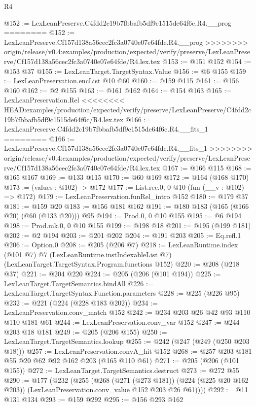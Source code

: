 \begin{lexlean}{R4}
\begin{coremodule}
{{{{{{{{@152 := LexLeanPreserve.C4fdd2c19b7fbbafb5df9c1515de64f6c.R4.__prog
========
@152 := LexLeanPreserve.Cf157d138a56cec2fc3a0740e07e64fde.R4.__prog
>>>>>>>> origin/release/v0.4:examples/production/expected/verify/preserve/LexLeanPreserve/Cf157d138a56cec2fc3a0740e07e64fde/R4.lex.tex
@153 := @151 @152
@154 := @153 @37
@155 := LexLeanTarget.TargetSyntax.Value
@156 := @6 @155
@159 := LexLeanPreservation.encList @10 @60
@160 := @159 @115
@161 := @156 @160
@162 := @2 @155
@163 := @161 @162
@164 := @154 @163
@165 := LexLeanPreservation.Rel
<<<<<<<< HEAD:examples/production/expected/verify/preserve/LexLeanPreserve/C4fdd2c19b7fbbafb5df9c1515de64f6c/R4.lex.tex
@166 := LexLeanPreserve.C4fdd2c19b7fbbafb5df9c1515de64f6c.R4.__fits_1
========
@166 := LexLeanPreserve.Cf157d138a56cec2fc3a0740e07e64fde.R4.__fits_1
>>>>>>>> origin/release/v0.4:examples/production/expected/verify/preserve/LexLeanPreserve/Cf157d138a56cec2fc3a0740e07e64fde/R4.lex.tex
@167 := @166 @115
@168 := @165 @167
@169 := @133 @115
@170 := @60 @169
@172 := @164 (@168 @170)
@173 := (values : @102) -> @172
@177 := List.rec.{0, 0} @10 (fun (__v : @102) => @172)
@179 := LexLeanPreservation.funRel_intro @152
@180 := @179 @37
@181 := @159 @20
@183 := @156 @181 @162
@191 := @180 @183 (@165 (@166 @20) (@60 (@133 @20))) @95
@194 := Prod.{0, 0} @10 @155
@195 := @6 @194
@198 := Prod.mk.{0, 0} @10 @155
@199 := @198 @18
@201 := @195 (@199 @181)
@202 := @2 @194
@203 := @201 @202
@204 := @191 @203
@205 := Eq.refl.{1}
@206 := Option.{0}
@208 := @205 (@206 @7)
@218 := LexLeanRuntime.index
    (@101 @7)
    @7
    (LexLeanRuntime.instIndexableList @7)
    (LexLeanTarget.TargetSyntax.Program.functions @152)
@220 := @208 (@218 @37)
@221 := @204 @220
@224 := @205 (@206 (@101 @194))
@225 := LexLeanTarget.TargetSemantics.bindAll
@226 := LexLeanTarget.TargetSyntax.Function.parameters
@228 := @225 (@226 @95)
@232 := @221 (@224 (@228 @183 @202))
@234 := LexLeanPreservation.conv_match @152
@242 := @234 @203 @26 @42 @93 @110 @110 @181 @61
@244 := LexLeanPreservation.conv_var @152
@247 := @244 @203 @18 @181
@249 := @205 (@206 @155)
@250 := LexLeanTarget.TargetSemantics.lookup
@255 := @242 (@247 (@249 (@250 @203 @18)))
@257 := LexLeanPreservation.convA_hit @152
@268 := @257 @203 @181 @55 @20 @62 @92 @162 @203 (@165 @110 @61)
@271 := @205 (@206 (@101 @155))
@272 := LexLeanTarget.TargetSemantics.destruct
@273 := @272 @55
@290 := @177
    (@232
      (@255
        (@268
          (@271 (@273 @181))
          (@224 (@225 @20 @162 @203))
          (LexLeanPreservation.conv_value @152 @203 @26 @61))))
@292 := @11 @131 @134
@293 := @159 @292
@295 := @156 @293 @162
}}}}}}}}
\end{coremodule}
\end{lexlean}
